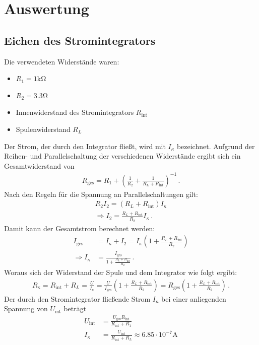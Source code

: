 \documentclass[12pt,a4paper,titlepage,headinclude,bibtotoc]{scrartcl}
\begin{document}
\section{Auswertung}
\label{sec:auswertung}
\subsection{Eichen des Stromintegrators}
Die verwendeten Widerstände waren:
\begin{itemize}
	\item $R_1=1\si{\kilo\ohm}$
	\item $R_2=3.3\si\ohm$
	\item Innenwiderstand des Stromintegrators $R_\text{int}$
	\item Spulenwiderstand $R_L$
\end{itemize}
Der Strom, der durch den Integrator fließt, wird mit $I_\kappa$ bezeichnet.
Aufgrund der Reihen- und Parallelschaltung der verschiedenen Widerstände ergibt sich ein Gesamtwiderstand von 
\begin{align}
		R_\text{ges}=R_1+\left(\frac{1}{R_2}+\frac{1}{R_L+R_\text{int}}\right)^{-1}\,.
\end{align}
Nach den Regeln für die Spannung an Parallelschaltungen gilt:
\begin{align*}
	R_2 I_2=(R_L+R_\text{int})I_\kappa\\
	\Rightarrow I_2=\frac{R_L+R_\text{int}}{R_2}I_\kappa\,.
\end{align*}
Damit kann der Gesamtstrom berechnet werden:
\begin{align*}
	I_\text{ges}&=I_\kappa+I_2=I_\kappa\left(1+\frac{R_L+R_\text{int}}{R_2}\right)\\
	\Rightarrow I_\kappa&=\frac{I_\text{ges}}{1+\frac{R_L+R_\text{int}}{R_2}}\,.
\end{align*}
Woraus sich der Widerstand der Spule und dem Integrator wie folgt ergibt:
\begin{align}
	R_\kappa=R_\text{int}+R_L=\frac U{I_\kappa}=\frac{U}{I_\text{ges}}\left(1+\frac{R_L+R_\text{int}}{R_2}\right)=R_\text{ges}\left(1+\frac{R_L+R_\text{int}}{R_2}\right)\,.
\end{align}
Der durch den Stromintegrator fließende Strom $I_\kappa$ bei einer anliegenden Spannung von $U_\text{int}$ beträgt
\begin{align}
	U_\text{int}&=\frac{U_\text{ges}R_\text{int}}{R_\text{int}+R_1}\\
	I_\kappa&=\frac{U_\text{int}}{R_\text{int}+R_L}\approx 6.85\cdot 10^{-7}\si\ampere
\end{align}
\end{document}
